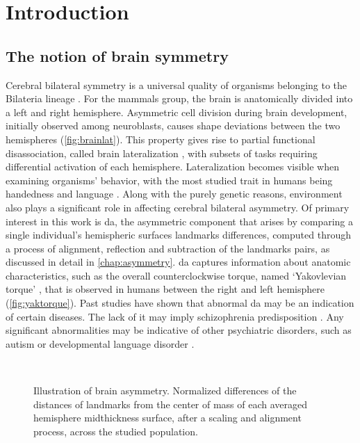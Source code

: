 \chapter{Introduction}
\label{chap:introduction}

\section{The notion of brain symmetry}
Cerebral bilateral symmetry is a universal quality of organisms belonging to the Bilateria lineage \cite{Corballis2009}\cite{Bailly2013}. For the mammals group, the brain is anatomically divided into a left and right hemisphere. Asymmetric cell division during brain development, initially observed among neuroblasts, causes shape deviations between the two hemispheres (\autoref{fig:brainlat}). This property gives rise to partial functional disassociation, called brain lateralization , with subsets of tasks requiring differential activation of each hemisphere. Lateralization becomes visible when examining organisms' behavior, with the most studied trait in humans being handedness and language \cite{Schmitz2019}. Along with the purely genetic reasons, environment also plays a significant role in affecting cerebral bilateral asymmetry.  Of primary interest in this work is \ac{da}, the asymmetric component that arises by comparing a single individual's hemispheric surfaces landmarks differences, computed through a process of alignment, reflection and subtraction of the landmarks pairs, as discussed in detail in \autoref{chap:asymmetry}. \ac{da} captures information about anatomic characteristics, such as the overall counterclockwise torque, named `Yakovlevian torque' \cite{LeMay1976}, that is observed in humans between the right and left hemisphere (\autoref{fig:yaktorque}). Past studies have shown that abnormal \ac{da} may be an indication of certain diseases. The lack of it may imply schizophrenia predisposition \cite{Ribolsi2014}. Any significant abnormalities may be indicative of other psychiatric disorders, such as autism or developmental language disorder \cite{Herbert2005}\cite{Kong2022}. 

\begin{figure}
	\centering
	\\
	\caption{Illustration of brain asymmetry. Normalized differences of the distances of landmarks from the center of mass of each averaged hemisphere midthickness surface, after a scaling and alignment process, across the studied population.}
	\label{fig:brainlat}
\end{figure}

